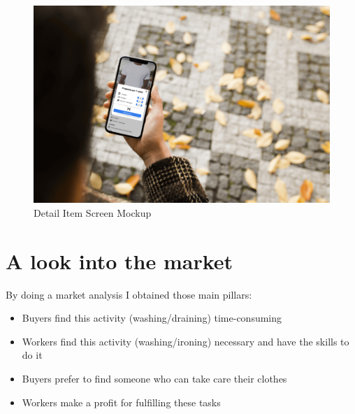 \begin{figure}[hbtp]
\caption{Detail Item Screen Mockup}
\centering
\includegraphics[scale=0.1]{../Images/mockup01.jpg}
\end{figure}
\newpage
\section{A look into the market}
By doing a market analysis I obtained those main pillars:
\begin{itemize}
\item Buyers find this activity (washing/draining) time-consuming
\item Workers find this activity (washing/ironing) necessary and  have the skills to do it
\item Buyers prefer to find  someone who can take care their clothes
\item Workers make a profit for fulfilling these tasks
\end{itemize}
